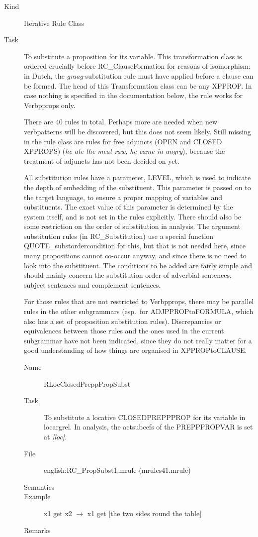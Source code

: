 \begin{description}
\item[Kind] Iterative Rule Class
\item[Task] To substitute a proposition for its variable. 
This transformation class is ordered crucially before RC\_ClauseFormation for 
reasons of isomorphism: in Dutch, the {\em graag\/}-substitution rule must have 
applied before a clause can be formed. The head of this Transformation 
class can be any XPPROP. In case nothing is specified in the documentation 
below, the rule works for Verbpprops only.

There are 40 rules in total. Perhaps more are needed when new verbpatterns will 
be discovered, but this does not seem likely. Still missing in the rule 
class are rules for free adjuncts (OPEN and CLOSED XPPROPS) ({\em he ate the 
meat raw, he came in angry\/}), because the treatment of adjuncts has not been 
decided on yet.

All substitution rules have a parameter, LEVEL, which is used to indicate the 
depth of embedding of the substituent. This parameter is passed on to the 
target language, to ensure a proper mapping of variables and substituents. The 
exact value of this parameter is determined by the system itself, and is not 
set in the rules explicitly. There should also be some restriction on the order
of substitution in analysis. The argument substitution rules 
(in RC\_Substitution) use a special 
function QUOTE\_substordercondition for this, but that is not needed here, 
since many propositions cannot co-occur anyway, and since there is no need to 
look into the substituent. The conditions to be added are fairly simple and 
should mainly concern the substitution order of adverbial sentences, subject 
sentences and complement sentences.

For those rules that are not restricted to Verbpprops, there may be parallel 
rules in 
the other subgrammars (esp.\ for ADJPPROPtoFORMULA, which also has a set of
proposition substitution rules). Discrepancies or 
equivalences between those rules and the ones used in the current subgrammar 
have not been indicated, since they do not really matter for a good 
understanding of how things are organised in XPPROPtoCLAUSE.

\vspace{1 cm}
\begin{description}
\item[Name] RLocClosedPreppPropSubst
\item[Task] To substitute a locative CLOSEDPREPPPROP for its variable in 
loc\-arg\-rel. In analysis, the actsubcefs of the PREPPPROPVAR is set at {\em 
[loc]\/}.
\item[File] english:RC\_PropSubst1.mrule (mrules41.mrule)
\item[Semantics]
\item[Example] x1 get x2 $\rightarrow$ x1 get [the two sides round the table]
\item[Remarks]
\end{description}


\end{description}
